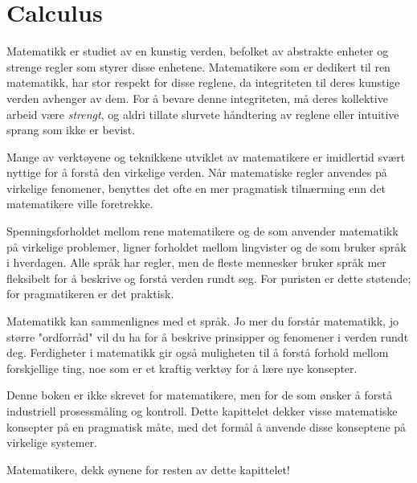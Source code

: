 \documentclass{book}
\begin{document}
\chapter{Calculus}

Matematikk er studiet av en kunstig verden, befolket av abstrakte enheter og strenge regler som styrer disse enhetene. Matematikere som er dedikert til ren matematikk, har stor respekt for disse reglene, da integriteten til deres kunstige verden avhenger av dem. For å bevare denne integriteten, må deres kollektive arbeid være \textit{strengt}, og aldri tillate slurvete håndtering av reglene eller intuitive sprang som ikke er bevist.

Mange av verktøyene og teknikkene utviklet av matematikere er imidlertid svært nyttige for å forstå den virkelige verden. Når matematiske regler anvendes på virkelige fenomener, benyttes det ofte en mer pragmatisk tilnærming enn det matematikere ville foretrekke.

Spenningsforholdet mellom rene matematikere og de som anvender matematikk på virkelige problemer, ligner forholdet mellom lingvister og de som bruker språk i hverdagen. Alle språk har regler, men de fleste mennesker bruker språk mer fleksibelt for å beskrive og forstå verden rundt seg. For puristen er dette støtende; for pragmatikeren er det praktisk.

Matematikk kan sammenlignes med et språk. Jo mer du forstår matematikk, jo større "ordforråd" vil du ha for å beskrive prinsipper og fenomener i verden rundt deg. Ferdigheter i matematikk gir også muligheten til å forstå forhold mellom forskjellige ting, noe som er et kraftig verktøy for å lære nye konsepter.

Denne boken er ikke skrevet for matematikere, men for de som ønsker å forstå industriell prosessmåling og kontroll. Dette kapittelet dekker visse matematiske konsepter på en pragmatisk måte, med det formål å anvende disse konseptene på virkelige systemer.

\vskip 10pt

Matematikere, dekk øynene for resten av dette kapittelet!
\end{document}
